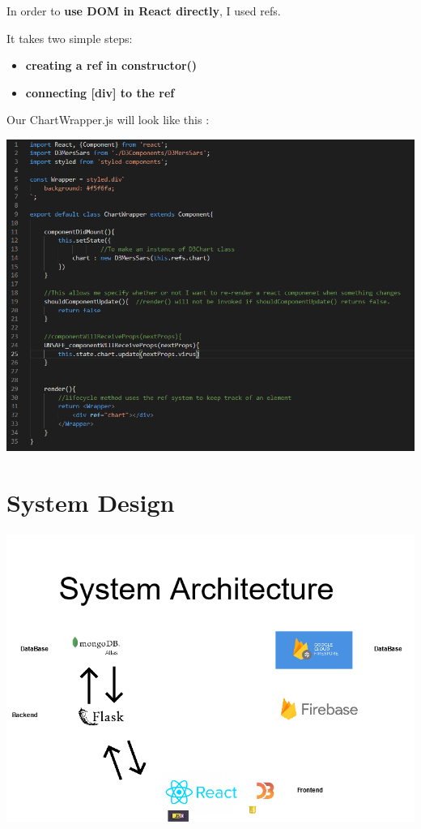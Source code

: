 In order to \textbf{use DOM in React directly}, I used refs. 

It takes two simple steps:

\begin{itemize}

\item \textbf{creating a ref in constructor()}
\item \textbf{connecting [div] to the ref}

\end{itemize}

Our ChartWrapper.js will look like this :

\begin{center}    
      \includegraphics[scale=0.6]{img/D3Ref.PNG}
\end{center}

\chapter{System Design}
\begin{center}    
      \includegraphics[scale=0.5]{img/basic architecture.png}
\end{center}

